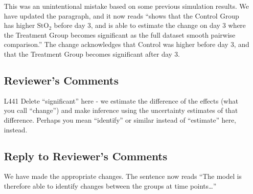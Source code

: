 \documentclass[
]{article}
\begin{document}
This was an unintentional mistake based on some previous simulation results. We have updated the paragraph, and it now reads ``shows that the Control Group has higher \(\mbox{StO}_2\) before day 3, and is able to estimate the change on day 3 where the Treatment Group becomes significant as the full dataset smooth pairwise comparison.'' The change acknowledges that Control was higher before day 3, and that the Treatment Group becomes significant after day 3.

\hypertarget{reviewers-comments-34}{%
\subsection{Reviewer's Comments}\label{reviewers-comments-34}}

L441 Delete ``significant'' here - we estimate the difference of the effects (what you call ``change'') and make inference using the uncertainty estimates of that difference. Perhaps you mean ``identify'' or similar instead of ``estimate'' here, instead.

\hypertarget{section-34}{%
\subsection{\texorpdfstring{\textcolor{reviewersblue} {Reply to Reviewer's Comments}}{}}\label{section-34}}

We have made the appropriate changes. The sentence now reads ``The model is therefore able to identify changes between the groups at time points\ldots{}''
\end{document}
